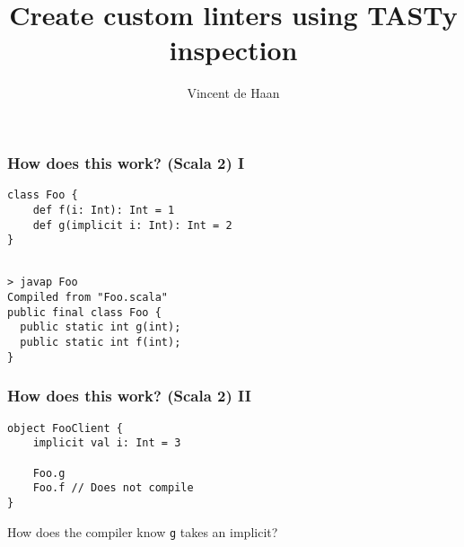 \documentclass[aspectratio=169]{beamer}
\title{Create custom linters using TASTy inspection}
\author{Vincent de Haan}
\date{}
\begin{document}
\frame{\maketitle}



\begin{frame}[fragile]
  \frametitle{How does this work? (Scala 2) I}
  
  \begin{lstlisting}[style=myScalastyle,frame=none]
class Foo {
    def f(i: Int): Int = 1
    def g(implicit i: Int): Int = 2
}
  \end{lstlisting}
  \pause
  \begin{lstlisting}[style=myTerminal,frame=none]

> javap Foo   
Compiled from "Foo.scala"
public final class Foo {
  public static int g(int);
  public static int f(int);
}
  \end{lstlisting}
  
\end{frame}

\begin{frame}[fragile]
  \frametitle{How does this work? (Scala 2) II}

  \begin{lstlisting}[style=myScalastyle,frame=none]
object FooClient {
    implicit val i: Int = 3
    
    Foo.g
    Foo.f // Does not compile
}
  \end{lstlisting}
  
  \pause
 
  How does the compiler know \texttt{g} takes an implicit?
\end{frame}
\end{document}
